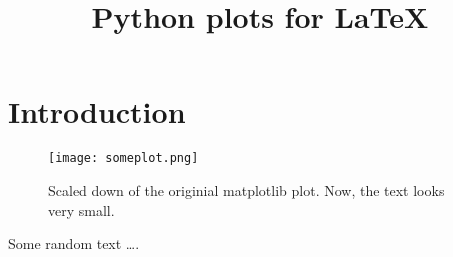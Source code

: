 \documentclass[twocolumn,a4paper]{scrartcl}
\title{Python plots for LaTeX}
\begin{document}
\maketitle
\section{Introduction}

\lipsum[1-1]

%
\begin{figure}[h]
  \centering
  \texttt{[image: someplot.png]}
  \caption{Scaled down of the originial matplotlib plot.
    Now, the text looks very small.}
  \label{image1}
\end{figure}
%


Some random text \dots.
\end{document}
